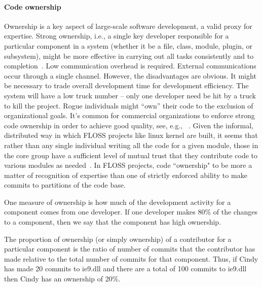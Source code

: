 \documentclass{sig-alternate-05-2015}
\begin{document}
\paragraph{Code ownership}
Ownership is a key aspect of large-scale software development,
 a valid proxy for expertise. Strong ownership, i.e., 
 a single key developer responsible for a particular component in a system (whether
it be a file, class, module, plugin, or subsystem), might be more
effective in carrying out all tasks consistently
and to completion~\cite{nordberg03}.
 Low communication overhead is required. External communications occur
through a single channel.
However, the disadvantages are obvious.
It might be necessary to trade overall development time for development
efficiency.  The system will have a low truck number -- only one developer 
need be hit by a truck to kill the project.
 Rogue individuals might ``own'' their code
to the exclusion of organizational goals.
It's common for commercial organizations to enforce strong code
ownership in order to achieve good quality, see, e.g., ~\cite{bird11}.
Given the informal, distributed way in which FLOSS projects like linux kernel are built, 
it seems that rather than
any single individual writing all the code for a given module, those in the core group
have a sufficient level of mutual trust that they contribute code to various modules as
needed~\cite{MFH02}. In FLOSS projects, code ``ownership" to be
more a matter of recognition of expertise than one of strictly enforced ability to make
commits to partitions of the code base.

One measure of ownership
is how much  of  the  development  activity  for  a  component
comes from one developer. If one developer makes 80\% of
the changes to a component, then we say that the component has high 
ownership. 

  The proportion of ownership  (or  simply  ownership)  of  a  contributor  for  a
particular component is the ratio of number of commits that the contributor has made 
relative to the total number of commits for that component.  Thus, if
Cindy has made 20 commits to ie9.dll and there are
a total of 100 commits to ie9.dll then Cindy has an ownership of 20\%.

\end{document}
